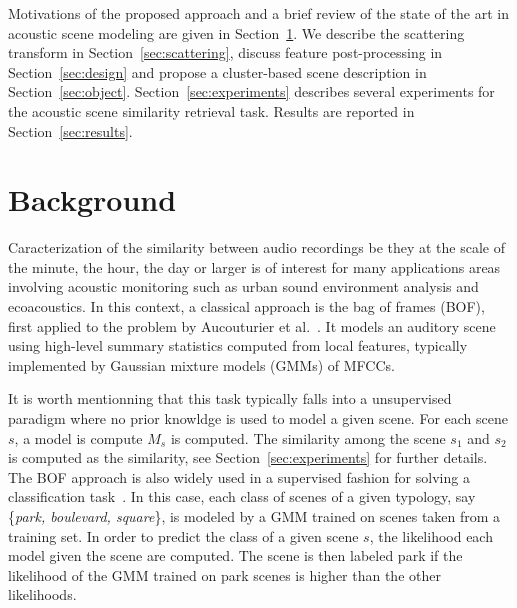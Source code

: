 \documentclass[smallextended]{svjour3}
\begin{document}
Motivations of the proposed approach and a brief review of the state of the art in acoustic scene modeling are given in Section~\ref{sec:soa}. We describe the scattering transform in Section~\ref{sec:scattering}, discuss feature post-processing in Section~\ref{sec:design} and propose a cluster-based scene description in Section~\ref{sec:object}. Section~\ref{sec:experiments} describes several experiments for the acoustic scene similarity retrieval task. Results are reported in Section~\ref{sec:results}.

\section{Background} \label{sec:soa}


Caracterization of the similarity between audio recordings be they at the scale of the minute, the hour, the day or larger is of interest for many applications areas involving acoustic monitoring such as urban sound environment analysis and ecoacoustics. In this context, a classical approach is the bag of frames (BOF), first applied to the problem by Aucouturier et al.~\cite{aucouturier2007bag}.
It models an auditory scene using high-level summary statistics computed from local features, typically implemented by Gaussian mixture models (GMMs) of MFCCs.

It is worth mentionning that this task typically falls into a unsupervised paradigm where no prior knowldge is used to model a given scene. For each scene $s$, a model is compute $M_s$ is computed. The similarity among the scene $s_1$ and $s_2$ is computed as the similarity, see Section~\ref{sec:experiments} for further details. The BOF approach is also widely used in a supervised fashion for solving a classification task~\cite{7100934}. In this case, each class of scenes of a given typology, say \{\emph{park, boulevard, square}\}, is modeled by a GMM trained on scenes taken from a training set. In order to predict the class of a given scene $s$, the likelihood each model given the scene are computed. The scene is then labeled park if the likelihood of the GMM trained on park scenes is higher than the other likelihoods.
\end{document}
